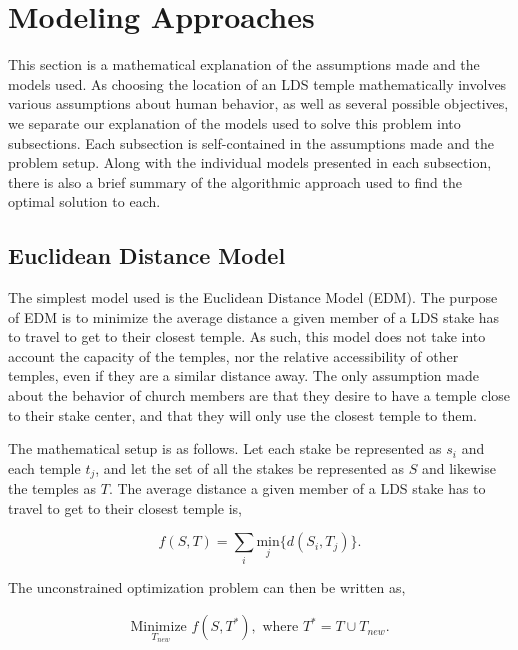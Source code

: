 \documentclass[twoside,twocolumn]{article}
\begin{document}
\section{Modeling Approaches}
\label{sec:models}
This section is a mathematical explanation of the assumptions made and the models used. As choosing the location of an LDS temple mathematically involves various assumptions about human behavior, as well as several possible objectives, we separate our explanation of the models used to solve this problem into subsections. Each subsection is self-contained in the assumptions made and the problem setup. Along with the individual models presented in each subsection, there is also a brief summary of the algorithmic approach used to find the optimal solution to each.

\subsection{Euclidean Distance Model} %

The simplest model used is the Euclidean Distance Model (EDM). The purpose of EDM is to minimize the average distance a given member of a LDS stake has to travel to get to their closest temple. As such, this model does not take into account the capacity of the temples, nor the relative accessibility of other temples, even if they are a similar distance away. The only assumption made about the behavior of church members are that they desire to have a temple close to their stake center, and that they will only use the closest temple to them.

The mathematical setup is as follows. Let each stake be represented as $s_i$ and each temple $t_j$, and let the set of all the stakes be represented as $S$ and likewise the temples as $T$. The average distance a given member of a LDS stake has to travel to get to their closest temple is, 

\begin{equation}
	f(S,T) = \sum_i \underset{j}{\text{min}}\{d(S_i,T_j)\}.
\end{equation}

The unconstrained optimization problem can then be written as,

\begin{equation}
\begin{aligned}
	\underset{T_{new}}{\text{Minimize }} f(S,T^*), \text{ where } T^* = T \cup T_{new}.
\end{aligned}
\end{equation}
\end{document}
